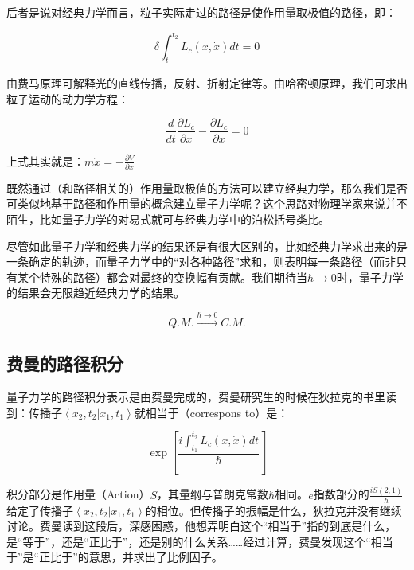 后者是说对经典力学而言，粒子实际走过的路径是使作用量取极值的路径，即：

\begin{equation}
\delta \int_{t_1}^{t_2} L_c (x, \dot x) dt = 0
\end{equation}

由费马原理可解释光的直线传播，反射、折射定律等。由哈密顿原理，我们可求出粒子运动的动力学方程：

\begin{equation}
\frac{d}{dt } \frac{\partial L_c}{\partial \dot x} - \frac{\partial L_c }{\partial x} = 0
\end{equation}

上式其实就是：$m \ddot x =  - \frac{\partial V}{ \partial x}$

既然通过（和路径相关的）作用量取极值的方法可以建立经典力学，那么我们是否可类似地基于路径和作用量的概念建立量子力学呢？这个思路对物理学家来说并不陌生，比如量子力学的对易式就可与经典力学中的泊松括号类比。

尽管如此量子力学和经典力学的结果还是有很大区别的，比如经典力学求出来的是一条确定的轨迹，而量子力学中的“对各种路径”求和，则表明每一条路径（而非只有某个特殊的路径）都会对最终的变换幅有贡献。我们期待当$\hbar \to 0$时，量子力学的结果会无限趋近经典力学的结果。

\begin{equation*}
Q.M. \xrightarrow{\hbar \to 0} C.M.
\end{equation*}

\subsection{费曼的路径积分}

量子力学的路径积分表示是由费曼完成的，费曼研究生的时候在狄拉克的书里读到：传播子$\left\langle x_2, t_2 | x_1, t_1 \right\rangle$就相当于（correspons to）是：

\begin{equation}
\exp \left[ {\frac{i \int_{t_1}^{t_2} L_c(x, \dot x) dt}{\hbar}} \right]
\end{equation}

积分部分是作用量（Action）$S$，其量纲与普朗克常数$\hbar$相同。$e$指数部分的$ \frac{i S(2,1)}{\hbar}$给定了传播子$\left\langle x_2, t_2 | x_1, t_1 \right\rangle$的相位。但传播子的振幅是什么，狄拉克并没有继续讨论。费曼读到这段后，深感困惑，他想弄明白这个“相当于”指的到底是什么，是“等于”，还是“正比于”，还是别的什么关系……经过计算，费曼发现这个“相当于”是“正比于”的意思，并求出了比例因子。


